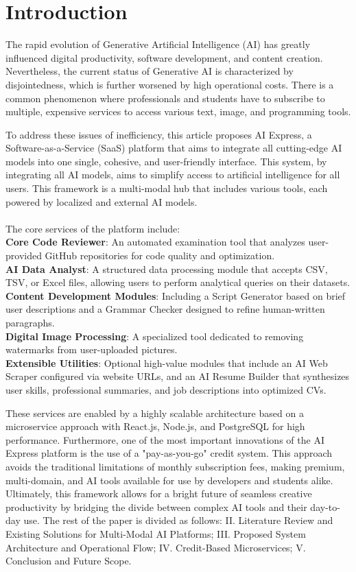 \documentclass[conference]{IEEEtran}
\begin{document}
\section{Introduction}
The rapid evolution of Generative Artificial Intelligence (AI) has greatly influenced digital productivity, software development, and content creation. Nevertheless, the current status of Generative AI is characterized by disjointedness, which is further worsened by high operational costs. There is a common phenomenon where professionals and students have to subscribe to multiple, expensive services to access various text, image, and programming tools.\\
\par To address these issues of inefficiency, this article proposes AI Express, a Software-as-a-Service (SaaS) platform that aims to integrate all cutting-edge AI models into one single, cohesive, and user-friendly interface. This system, by integrating all AI models, aims to simplify access to artificial intelligence for all users. This framework is a multi-modal hub that includes various tools, each powered by localized and external AI models.\\\\
The core services of the platform include:\\
\textbf{Core Code Reviewer}: An automated examination tool that analyzes user-provided GitHub repositories for code quality and optimization.\\
\textbf{AI Data Analyst}: A structured data processing module that accepts CSV, TSV, or Excel files, allowing users to perform analytical queries on their datasets.\\
\textbf{Content Development Modules}: Including a Script Generator based on brief user descriptions and a Grammar Checker designed to refine human-written paragraphs.\\
\textbf{Digital Image Processing}: A specialized tool dedicated to removing watermarks from user-uploaded pictures.\\
\textbf{Extensible Utilities}: Optional high-value modules that include an AI Web Scraper configured via website URLs, and an AI Resume Builder that synthesizes user skills, professional summaries, and job descriptions into optimized CVs.\\
\par These services are enabled by a highly scalable architecture based on a microservice approach with React.js, Node.js, and PostgreSQL for high performance. Furthermore, one of the most important innovations of the AI Express platform is the use of a "pay-as-you-go" credit system. This approach avoids the traditional limitations of monthly subscription fees, making premium, multi-domain, and AI tools available for use by developers and students alike. Ultimately, this framework allows for a bright future of seamless creative productivity by bridging the divide between complex AI tools and their day-to-day use. The rest of the paper is divided as follows: II. Literature Review and Existing Solutions for Multi-Modal AI Platforms; III. Proposed System Architecture and Operational Flow; IV. Credit-Based Microservices; V. Conclusion and Future Scope.
\end{document}
